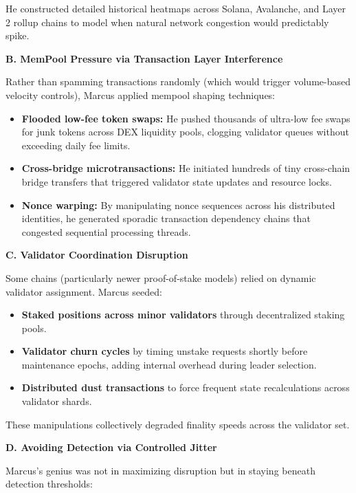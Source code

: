 He constructed detailed historical heatmaps across Solana, Avalanche, and Layer 2 rollup chains to model when natural network congestion would predictably spike.

\medskip

\textbf{B. MemPool Pressure via Transaction Layer Interference}

Rather than spamming transactions randomly (which would trigger volume-based velocity controls), Marcus applied mempool shaping techniques:

\begin{itemize}
    \item \textbf{Flooded low-fee token swaps:} He pushed thousands of ultra-low fee swaps for junk tokens across DEX liquidity pools, clogging validator queues without exceeding daily fee limits.
    \item \textbf{Cross-bridge microtransactions:} He initiated hundreds of tiny cross-chain bridge transfers that triggered validator state updates and resource locks.
    \item \textbf{Nonce warping:} By manipulating nonce sequences across his distributed identities, he generated sporadic transaction dependency chains that congested sequential processing threads.
\end{itemize}

\medskip

\textbf{C. Validator Coordination Disruption}

Some chains (particularly newer proof-of-stake models) relied on dynamic validator assignment. Marcus seeded:

\begin{itemize}
    \item \textbf{Staked positions across minor validators} through decentralized staking pools.
    \item \textbf{Validator churn cycles} by timing unstake requests shortly before maintenance epochs, adding internal overhead during leader selection.
    \item \textbf{Distributed dust transactions} to force frequent state recalculations across validator shards.
\end{itemize}

These manipulations collectively degraded finality speeds across the validator set.

\medskip

\textbf{D. Avoiding Detection via Controlled Jitter}

Marcus’s genius was not in maximizing disruption but in staying beneath detection thresholds:

